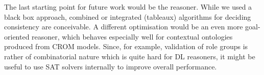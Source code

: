 The last starting point for future work would be the reasoner. While we used a black box approach,
combined or integrated (tableaux) algorithms for deciding consistency are conceivable. A different
optimisation would be an even more goal-oriented reasoner, which behaves especially well for
contextual ontologies produced from CROM models. Since, for example, validation of role groups is
rather of combinatorial nature which is quite hard for DL reasoners, it might be useful to use SAT
solvers internally to improve overall performance.





